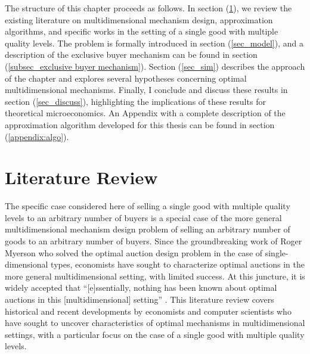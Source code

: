 The structure of this chapter proceeds as follows. In section (\ref{sec_litreview}), we review the existing literature on multidimensional mechanism design, approximation algorithms, and specific works in the setting of a single good with multiple quality levels. The problem is formally introduced in section (\ref{sec_model}), and a description of the exclusive buyer mechanism can be found in section (\ref{subsec_exclusive buyer mechanism}). Section (\ref{sec_sim}) describes the approach of the chapter and explores several hypotheses concerning optimal multidimensional mechanisms. Finally, I conclude and discuss these results in section (\ref{sec_discuss}), highlighting the implications of these results for theoretical microeconomics. An Appendix with a complete description of the approximation algorithm developed for this thesis can be found in section (\ref{appendix:algo}).








\section{Literature Review}\label{sec_litreview}


The specific case considered here of selling a single good with multiple quality levels to an arbitrary number of buyers is a special case of the more general multidimensional mechanism design problem of selling an arbitrary number of goods to an arbitrary number of buyers. Since the groundbreaking work of Roger Myerson \autocite*{myerson1981optimal} who solved the optimal auction design problem in the case of single-dimensional types, economists have sought to characterize optimal auctions in the more general multidimensional setting, with limited success. At this juncture, it is widely accepted that ``[e]ssentially, nothing has been known about optimal auctions in this [multidimensional] setting'' \autocite[p1]{kolesnikov2022}. This literature review covers historical and recent developments by economists and computer scientists who have sought to uncover characteristics of optimal mechanisms in multidimensional settings, with a particular focus on the case of a single good with multiple quality levels.

